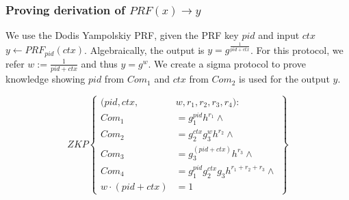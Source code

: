 \newpage
\subsubsection{Proving derivation of $PRF(x) \to y$}
We use the Dodis Yampolskiy PRF, given the PRF key $pid$ and input $ctx$ $y \gets PRF_{pid}(ctx)$. Algebraically, the output is $y = g^{\frac{1}{pid + ctx}}$. For this protocol, we refer $w := {\frac{1}{pid + ctx}}$ and thus $y = g^w$. We create a sigma protocol to prove knowledge showing $pid$ from $Com_1$ and $ctx$ from $Com_2$ is used for the output $y$. 

\[
ZKP
    \left\{ 
    \begin{aligned}
    (pid, ctx, &w, r_1, r_2, r_3, r_4): \\
    Com_1 &= g_1^{pid} h^{r_1} \wedge \\
    Com_2 &= g_2^{ctx}g_3^{w} h^{r_2} \wedge  \\
    Com_3 &= g_3^{(pid + ctx)} h^{r_3} \wedge \\
    Com_4 &= g_1^{pid}g_2^{ctx}g_3h^{r_1 + r_2 + r_3} \wedge \\
    w \cdot (pid + ctx) &= 1
    \end{aligned}
    \right\}
\]

